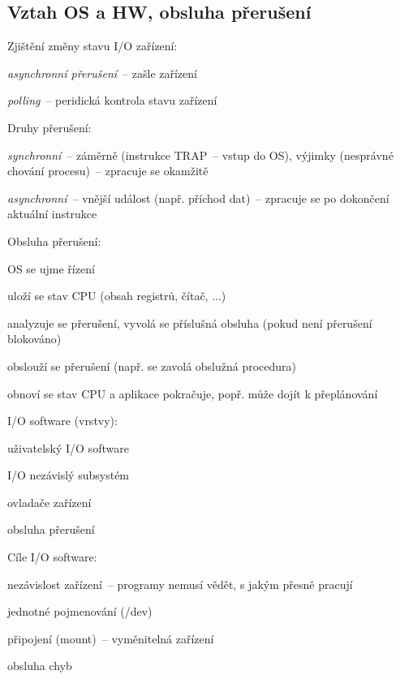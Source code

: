 \subsection{Vztah OS a HW, obsluha přerušení}

\begin{obecne}{Zjištění změny stavu I/O zařízení:}
\begin{pitemize}
	\item \emph{asynchronní přerušení}~-- zašle zařízení
	\item \emph{polling}~-- peridická kontrola stavu zařízení
\end{pitemize}
\end{obecne}

\begin{obecne}{Druhy přerušení:}
\begin{pitemize}
	\item \emph{synchronní}~-- záměrně (instrukce TRAP~-- vstup do OS), výjimky (nesprávné chování procesu)~-- zpracuje se okamžitě
	\item \emph{asynchronní}~-- vnější událost (např. příchod dat)~-- zpracuje se po dokončení aktuální instrukce 
\end{pitemize}
\end{obecne}

\begin{obecne}{Obsluha přerušení:}
\begin{pitemize}
	\item OS se ujme řízení
	\item uloží se stav CPU (obsah registrů, čítač, ...)
	\item analyzuje se přerušení, vyvolá se příslušná obsluha (pokud není přerušení blokováno)
	\item obslouží se přerušení (např. se zavolá obslužná procedura)
	\item obnoví se stav CPU a aplikace pokračuje, popř. může dojít k přeplánování 
\end{pitemize}
\end{obecne}

\begin{obecne}{I/O software (vrstvy):}
\begin{pitemize}
	\item uživatelský I/O software
	\item I/O nezávislý subsystém
	\item ovladače zařízení
	\item obsluha přerušení 
\end{pitemize}
\end{obecne}

\begin{obecne}{Cíle I/O software:}
\begin{pitemize}
	\item nezávislost zařízení~-- programy nemusí vědět, s jakým přesně pracují
	\item jednotné pojmenování (/dev)
	\item připojení (mount)~-- vyměnitelná zařízení
	\item obsluha chyb
\end{pitemize}
\end{obecne}
